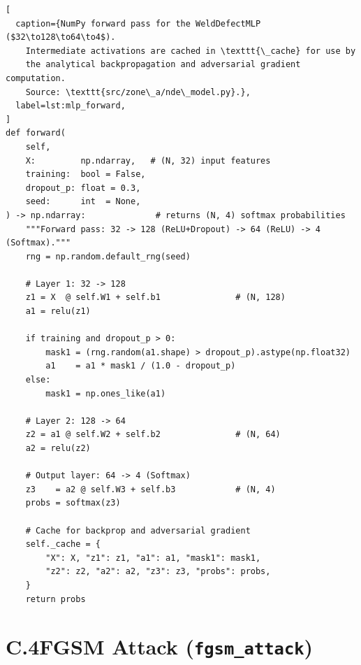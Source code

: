 \begin{lstlisting}[
  caption={NumPy forward pass for the WeldDefectMLP ($32\to128\to64\to4$).
    Intermediate activations are cached in \texttt{\_cache} for use by
    the analytical backpropagation and adversarial gradient computation.
    Source: \texttt{src/zone\_a/nde\_model.py}.},
  label=lst:mlp_forward,
]
def forward(
    self,
    X:         np.ndarray,   # (N, 32) input features
    training:  bool = False,
    dropout_p: float = 0.3,
    seed:      int  = None,
) -> np.ndarray:              # returns (N, 4) softmax probabilities
    """Forward pass: 32 -> 128 (ReLU+Dropout) -> 64 (ReLU) -> 4 (Softmax)."""
    rng = np.random.default_rng(seed)

    # Layer 1: 32 -> 128
    z1 = X  @ self.W1 + self.b1               # (N, 128)
    a1 = relu(z1)

    if training and dropout_p > 0:
        mask1 = (rng.random(a1.shape) > dropout_p).astype(np.float32)
        a1    = a1 * mask1 / (1.0 - dropout_p)
    else:
        mask1 = np.ones_like(a1)

    # Layer 2: 128 -> 64
    z2 = a1 @ self.W2 + self.b2               # (N, 64)
    a2 = relu(z2)

    # Output layer: 64 -> 4 (Softmax)
    z3    = a2 @ self.W3 + self.b3            # (N, 4)
    probs = softmax(z3)

    # Cache for backprop and adversarial gradient
    self._cache = {
        "X": X, "z1": z1, "a1": a1, "mask1": mask1,
        "z2": z2, "a2": a2, "z3": z3, "probs": probs,
    }
    return probs
\end{lstlisting}

\section*{C.4\quad FGSM Attack (\texttt{fgsm\_attack})}

